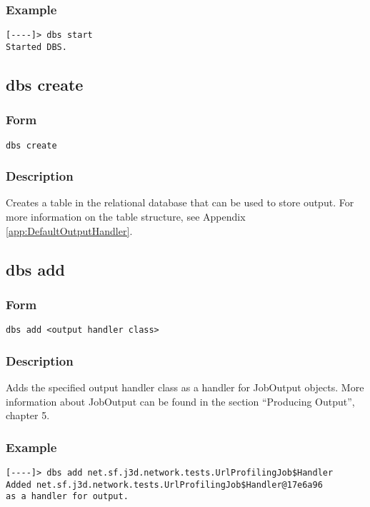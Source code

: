 \documentclass[12pt]{article}
\begin{document}
\subsubsection{Example}
\begin{verbatim}
[----]> dbs start
Started DBS.
\end{verbatim}

\subsection{dbs create}
\subsubsection{Form}
\begin{verbatim}
dbs create
\end{verbatim}
\subsubsection{Description}
Creates a table in the relational database that can be used to store output. For more information on the table structure, see Appendix \ref{app:DefaultOutputHandler}.

\subsection{dbs add}
\subsubsection{Form}
\begin{verbatim}
dbs add <output handler class>
\end{verbatim}
\subsubsection{Description}
Adds the specified output handler class as a handler for JobOutput objects. More information about JobOutput can be found in the section ``Producing Output'', chapter 5.
\subsubsection{Example}
\begin{verbatim}
[----]> dbs add net.sf.j3d.network.tests.UrlProfilingJob$Handler
Added net.sf.j3d.network.tests.UrlProfilingJob$Handler@17e6a96
as a handler for output.
\end{verbatim}
\end{document}
